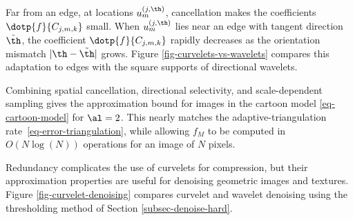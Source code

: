 Far from an edge, at locations $u_m^{(j,\th)}$, cancellation makes the coefficients $\dotp{f}{C_{j,m,k}}$ small. When $u_m^{(j,\th)}$ lies near an edge with tangent direction $\tilde\th$, the coefficient $\dotp{f}{C_{j,m,k}}$ rapidly decreases as the orientation mismatch $|\th-\tilde \th|$ grows. Figure \ref{fig-curvelets-vs-wavelets} compares this adaptation to edges with the square supports of directional wavelets.



Combining spatial cancellation, directional selectivity, and scale-dependent sampling gives the approximation bound
for images in the cartoon model \eqref{eq-cartoon-model} for $\al=2$.
This nearly matches the adaptive-triangulation rate~\eqref{eq-error-triangulation}, while allowing $f_M$ to be computed in $O(N \log(N))$ operations for an image of $N$ pixels.

Redundancy complicates the use of curvelets for compression, but their approximation properties are useful for denoising geometric images and textures. Figure \ref{fig-curvelet-denoising} compares curvelet and wavelet denoising using the thresholding method of Section \ref{subsec-denoise-hard}.








